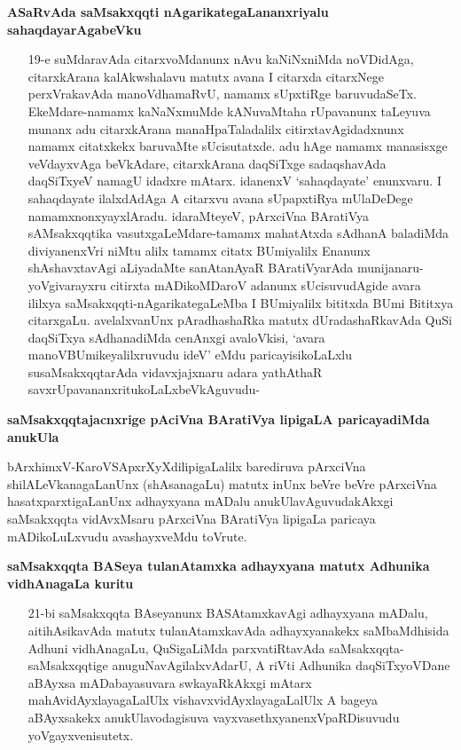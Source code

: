 \textbf{ASaRvAda saMsakxqqti nAgarikategaLananxriyalu sahaqdayarAgabeVku}

\begin{itemize}
\item[19-e] suMdaravAda citarxvoMdanunx nAvu kaNiNxniMda noVDidAga, citarxkArana kalAkwshalavu matutx avana I citarxda citarxNege perxVrakavAda manoVdhamaRvU, namamx sUpxtiRge baruvudaSeTx. EkeMdare-namamx kaNaNxmuMde kANuvaMtaha rUpavanunx taLeyuva munanx adu citarxkArana manaHpaTaladalilx citirxtavAgidadxnunx namamx citatxkekx baruvaMte sUcisutatxde. adu hAge namamx manasisxge veVdayxvAga beVkAdare, citarxkArana daqSiTxge sadaqshavAda daqSiTxyeV namagU idadxre mAtarx. idanenxV `sahaqdayate' enunxvaru. I sahaqdayate ilalxdAdAga A citarxvu avana sUpapxtiRya mUlaDeDege namamxnonxyayxlAradu. idaraMteyeV, pArxciVna BAratiVya sAMsakxqqtika vasutxgaLeMdare-tamamx mahatAtxda sAdhanA baladiMda diviyanenxVri niMtu alilx tamamx citatx BUmiyalilx Enanunx shAshavxtavAgi aLiyadaMte sanAtanAyaR BAratiVyarAda munijanaru-yoVgivarayxru citirxta mADikoMDaroV adanunx sUcisuvudAgide avara ililxya saMsakxqqti-nAgarikategaLeMba I BUmiyalilx bititxda BUmi Bititxya citarxgaLu. avelalxvanUnx pAradhashaRka matutx dUradashaRkavAda QuSi daqSiTxya sAdhanadiMda cenAnxgi avaloVkisi, `avara manoVBUmikeyalilxruvudu ideV' eMdu paricayisikoLaLxlu susaMsakxqqtarAda vidavxjajxnaru adara yathAthaR savxrUpavananxritukoLaLxbeVkAguvudu-
\end{itemize}

\textbf{saMsakxqqtajacnxrige pAciVna BAratiVya lipigaLA paricayadiMda anukUla}

bArxhimxV-KaroVSApxrXyXdilipigaLalilx barediruva pArxciVna shilALeVkanagaLanUnx (shAsanagaLu) matutx inUnx beVre beVre pArxciVna hasatxparxtigaLanUnx adhayxyana mADalu anukUlavAguvudakAkxgi saMsakxqqta vidAvxMsaru pArxciVna BAratiVya lipigaLa paricaya mADikoLuLxvudu avashayxveMdu toVrute.

\textbf{saMsakxqqta BASeya tulanAtamxka adhayxyana matutx Adhunika vidhAnagaLa kuritu}

\begin{itemize}
\item[21-bi] saMsakxqqta BAseyanunx BASAtamxkavAgi adhayxyana mADalu, aitihAsikavAda matutx tulanAtamxkavAda adhayxyanakekx saMbaMdhisida Adhuni vidhAnagaLu, QuSigaLiMda parxvatiRtavAda saMsakxqqta-saMsakxqqtige anuguNavAgilalxvAdarU, A riVti Adhunika daqSiTxyoVDane aBAyxsa mADabayasuvara swkayaRkAkxgi mAtarx mahAvidAyxlayagaLalUlx vishavxvidAyxlayagaLalUlx A bageya aBAyxsakekx anukUlavodagisuva vayxvasethxyanenxVpaRDisuvudu yoVgayxvenisutetx.
\end{itemize}


